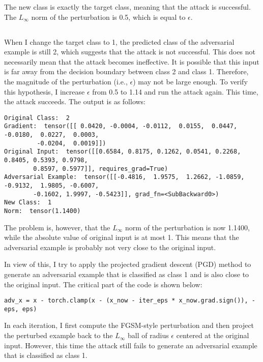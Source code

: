 \documentclass[10pt]{article}
\begin{document}
The new class is exactly the target class, meaning that the attack is successful. The $L_\infty$ norm of the perturbation is 0.5, which is equal to $\epsilon$.

\newpage
\subsection{}

When I change the target class to 1, the predicted class of the adversarial example is still 2, which suggests that the attack is not successful. This does not necessarily mean that the attack becomes ineffective. It is possible that this input is far away from the decision boundary between class 2 and class 1. Therefore, the magnitude of the perturbation (i.e., $\epsilon$) may not be large enough. To verify this hypothesis, I increase $\epsilon$ from 0.5 to 1.14 and run the attack again. This time, the attack succeeds. The output is as follows:

\begin{Verbatim}[frame=single]
Original Class:  2
Gradient:  tensor([[ 0.0420, -0.0004, -0.0112,  0.0155,  0.0447, -0.0180,  0.0227,  0.0003,
         -0.0204,  0.0019]])
Original Input:  tensor([[0.6584, 0.8175, 0.1262, 0.0541, 0.2268, 0.8405, 0.5393, 0.9798, 
        0.8597, 0.5977]], requires_grad=True)
Adversarial Example:  tensor([[-0.4816,  1.9575,  1.2662, -1.0859, -0.9132,  1.9805, -0.6007,
        -0.1602, 1.9997, -0.5423]], grad_fn=<SubBackward0>)
New Class:  1
Norm:  tensor(1.1400)
\end{Verbatim}

The problem is, however, that the $L_\infty$ norm of the perturbation is now 1.1400, while the absolute value of original input is at most 1. This means that the adversarial example is probably not very close to the original input.

In view of this, I try to apply the projected gradient descent (PGD) method to generate an adversarial example that is classified as class 1 and is also close to the original input. The critical part of the code is shown below:

\begin{Verbatim}[frame=single]
adv_x = x - torch.clamp(x - (x_now - iter_eps * x_now.grad.sign()), -eps, eps)
\end{Verbatim}

In each iteration, I first compute the FGSM-style perturbation and then project the perturbed example back to the $L_\infty$ ball of radius $\epsilon$ centered at the original input. However, this time the attack still fails to generate an adversarial example that is classified as class 1.
\end{document}
